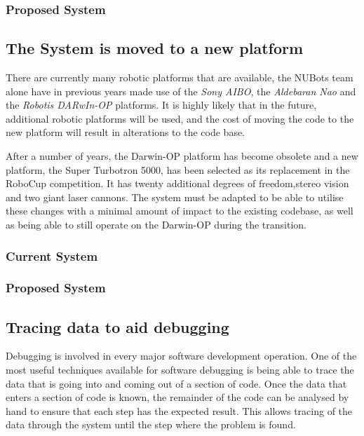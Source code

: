 \documentclass[english,12pt]{scrartcl}
\begin{document}
            \subsubsection{Proposed System}
        
        \subsection{The System is moved to a new platform}
            There are currently many robotic platforms that are available, the NUBots team alone
            have in previous years made use of the \emph{Sony AIBO}, the \emph{Aldebaran Nao} and
            the \emph{Robotis DARwIn-OP} platforms. It is highly likely that in the future,
            additional robotic platforms will be used, and the cost of moving the code to the new
            platform will result in alterations to the code base.
            
            After a number of years, the Darwin-OP platform has become obsolete and a new platform,
            the Super Turbotron 5000, has been selected as its replacement in the RoboCup
            competition. It has twenty additional degrees of freedom,stereo vision and two giant
            laser cannons. The system must be adapted to be able to utilise these changes with a
            minimal amount of impact to the existing codebase, as well as being able to still
            operate on the Darwin-OP during the transition.
            
            \subsubsection{Current System}
            \subsubsection{Proposed System}
                            
        \subsection{Tracing data to aid debugging}
        	Debugging is involved in every major software development operation. One of the most
			useful techniques available for software debugging is being able to trace the data that
			is going into and coming out of a section of code. Once the data that enters a section
			of code is known, the remainder of the code can be analysed by hand to ensure that each
			step has the expected result. This allows tracing of the data through the system until
			the step where the problem is found.
			
\end{document}

